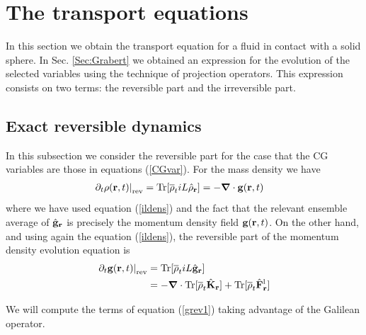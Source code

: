 \documentclass[b5paper,openright,10pt]{book}
\begin{document}
\section{The transport equations}
\label{Sec:Transequation}
In this section we obtain the transport equation for a fluid in contact with a solid sphere. In Sec. \ref{Sec:Grabert} we obtained an expression for the evolution of the selected variables using the technique of projection operators. This expression consists on two terms: the reversible part and the irreversible part. 

\subsection{Exact reversible dynamics}\label{Sec:ExactCont}
In this subsection we consider the reversible part for the case that the CG variables are those in equations (\ref{CGvar}).
For the mass density we have
\begin{align}
\left.\partial_t \rho({\bf r},t)\right|_{\rm rev}
&=  {\rm Tr}[\overline{\rho}_t  iL\hat{\rho}_{\bf r}] 
=-\boldsymbol{\nabla}\cdot {\bf  g}({\bf r},t)
\label{conrho}
\end{align}
where we have used equation (\ref{ildens}) and the fact that the relevant
ensemble average of $\hat{\bf g}_{\bf  r}$ is precisely  the momentum
density field ${\bf g}({\bf r},t)$.  On the other hand, and using again the equation (\ref{ildens}), the reversible
part of the momentum density evolution equation is
\begin{align}
\left.\partial_t {\bf g}({\bf r},t)\right|_{\rm rev}
&=  {\rm Tr}[\overline{\rho}_t  iL\hat{{\bf g}}_{\bf r}] 
\nonumber\\
&=-\boldsymbol{\nabla}\cdot  {\rm Tr}[\overline{\rho}_t \hat{{\bf K}}_{\bf r}] 
+  {\rm Tr}[\overline{\rho}_t  \hat{\bf F}^{\rm l}_{\bf r}]
\label{grev1}
\end{align}

We will compute the terms of equation (\ref{grev1}) taking advantage of the Galilean operator. 
\end{document}
